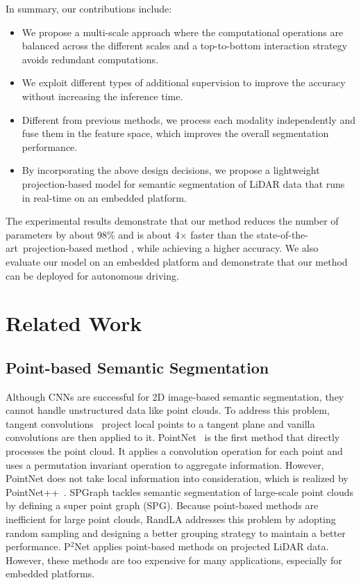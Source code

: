 \documentclass[letterpaper, 10 pt, journal, twoside]{ieeetran}
\def\sArt{{state-of-the-art~}}
\begin{document}
In summary, our contributions include:
\begin{itemize}
    \item We propose a multi-scale approach where the computational operations are balanced across the different scales and a top-to-bottom interaction strategy avoids redundant computations. 
\item We exploit different types of additional supervision to improve the accuracy without increasing the inference time.
\item Different from previous methods, we process each modality independently and fuse them in the feature space, which improves the overall segmentation performance.
\item By incorporating the above design decisions, we propose a lightweight projection-based model for semantic segmentation of LiDAR data that runs in real-time on an embedded platform.
\end{itemize}
The experimental results demonstrate that our method reduces the number of parameters by about 98\% and is about 4$\times$ faster than the \sArt projection-based method \cite{milioto2019rangenet++}, while achieving a higher accuracy.
We also evaluate our model on an embedded platform and demonstrate that our method can be deployed for autonomous driving.




\section{Related Work}

\subsection{Point-based Semantic Segmentation}
Although CNNs \cite{chen2017rethinking,zhao2017pyramid,howard2019searching,ma2018shufflenet} are successful for 2D image-based semantic segmentation, they cannot handle unstructured data like point clouds.
To address this problem, tangent convolutions~\cite{tatarchenko2018tangent} 
project local points to a tangent plane and vanilla convolutions are then applied to it.
PointNet~\cite{qi2017pointnet} is the first method that directly 
processes the point cloud.
It applies a convolution operation for each point and uses a permutation invariant operation to aggregate information.
However, PointNet does not take local information into consideration, which is realized by PointNet++~\cite{qi2017pointnet++}.
SPGraph \cite{landrieu2018large} tackles semantic segmentation of large-scale point clouds by defining a super point graph (SPG).
Because point-based methods are inefficient for large point clouds, RandLA \cite{hu2019randla} addresses this problem by adopting random sampling and designing a better grouping strategy to maintain a better performance.
P$^2$Net \cite{li2020projected} applies point-based methods on projected LiDAR data.
However, these methods are too expensive for many applications, especially for embedded platforms.
\end{document}
